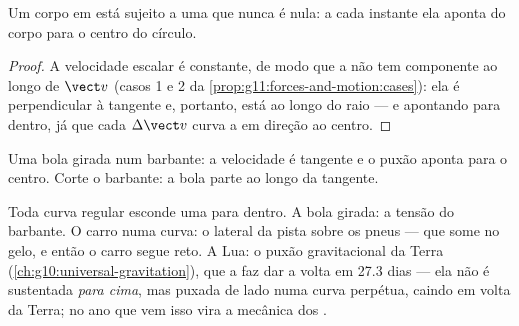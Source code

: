 \begin{proposition}\label{prop:g11:forces-and-motion:inward}
Um corpo em  está sujeito a uma  que nunca é nula: a cada instante ela aponta do corpo para o
centro do círculo.
\end{proposition}

\begin{proof}
A velocidade escalar é constante, de modo que a  não tem
componente ao longo de $\vect v$ (casos 1 e 2 da
\cref{prop:g11:forces-and-motion:cases}): ela é perpendicular à tangente
e, portanto, está ao longo do raio --- e apontando para dentro, já que
cada $\Delta \vect v$ curva a  em direção ao centro.
\end{proof}

\begin{omfigure}

{\small Uma bola girada num barbante: a velocidade é tangente e o puxão
aponta para o centro. Corte o barbante: a bola parte ao longo da
tangente.}
\end{omfigure}

\begin{example}\label{ex:g11:forces-and-motion:moon}
Toda curva regular esconde uma  para dentro. A bola girada: a tensão
do barbante. O carro numa curva: o  lateral da pista sobre
os pneus --- que some no gelo, e então o carro segue reto. A Lua: o puxão
gravitacional da Terra (\cref{ch:g10:universal-gravitation}), que a faz
dar a volta em \num{27.3} dias --- ela não é sustentada \emph{para
cima}, mas puxada de lado numa curva perpétua, caindo em volta da Terra;
no ano que vem isso vira a mecânica dos .
\end{example}

